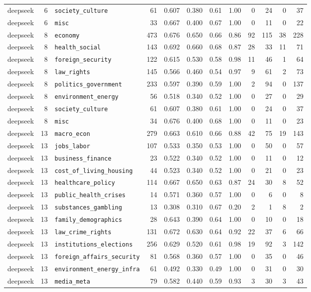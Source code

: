 \begin{landscape}
\begin{longtable}{@{}l r l r r r r r r r r r@{}}
deepseek & 6 & \texttt{society\_culture} & 61 & 0.607 & 0.380 & 0.61 & 1.00 & 0 & 24 & 0 & 37\\
deepseek & 6 & \texttt{misc} & 33 & 0.667 & 0.400 & 0.67 & 1.00 & 0 & 11 & 0 & 22\\
\midrule
deepseek & 8 & \texttt{economy} & 473 & 0.676 & 0.650 & 0.66 & 0.86 & 92 & 115 & 38 & 228\\
deepseek & 8 & \texttt{health\_social} & 143 & 0.692 & 0.660 & 0.68 & 0.87 & 28 & 33 & 11 & 71\\
deepseek & 8 & \texttt{foreign\_security} & 122 & 0.615 & 0.530 & 0.58 & 0.98 & 11 & 46 & 1 & 64\\
deepseek & 8 & \texttt{law\_rights} & 145 & 0.566 & 0.460 & 0.54 & 0.97 & 9 & 61 & 2 & 73\\
deepseek & 8 & \texttt{politics\_government} & 233 & 0.597 & 0.390 & 0.59 & 1.00 & 2 & 94 & 0 & 137\\
deepseek & 8 & \texttt{environment\_energy} & 56 & 0.518 & 0.340 & 0.52 & 1.00 & 0 & 27 & 0 & 29\\
deepseek & 8 & \texttt{society\_culture} & 61 & 0.607 & 0.380 & 0.61 & 1.00 & 0 & 24 & 0 & 37\\
deepseek & 8 & \texttt{misc} & 34 & 0.676 & 0.400 & 0.68 & 1.00 & 0 & 11 & 0 & 23\\
\midrule
deepseek & 13 & \texttt{macro\_econ} & 279 & 0.663 & 0.610 & 0.66 & 0.88 & 42 & 75 & 19 & 143\\
deepseek & 13 & \texttt{jobs\_labor} & 107 & 0.533 & 0.350 & 0.53 & 1.00 & 0 & 50 & 0 & 57\\
deepseek & 13 & \texttt{business\_finance} & 23 & 0.522 & 0.340 & 0.52 & 1.00 & 0 & 11 & 0 & 12\\
deepseek & 13 & \texttt{cost\_of\_living\_housing} & 44 & 0.523 & 0.340 & 0.52 & 1.00 & 0 & 21 & 0 & 23\\
deepseek & 13 & \texttt{healthcare\_policy} & 114 & 0.667 & 0.650 & 0.63 & 0.87 & 24 & 30 & 8 & 52\\
deepseek & 13 & \texttt{public\_health\_crises} & 14 & 0.571 & 0.360 & 0.57 & 1.00 & 0 & 6 & 0 & 8\\
deepseek & 13 & \texttt{substances\_gambling} & 13 & 0.308 & 0.310 & 0.67 & 0.20 & 2 & 1 & 8 & 2\\
deepseek & 13 & \texttt{family\_demographics} & 28 & 0.643 & 0.390 & 0.64 & 1.00 & 0 & 10 & 0 & 18\\
deepseek & 13 & \texttt{law\_crime\_rights} & 131 & 0.672 & 0.630 & 0.64 & 0.92 & 22 & 37 & 6 & 66\\
deepseek & 13 & \texttt{institutions\_elections} & 256 & 0.629 & 0.520 & 0.61 & 0.98 & 19 & 92 & 3 & 142\\
deepseek & 13 & \texttt{foreign\_affairs\_security} & 81 & 0.568 & 0.360 & 0.57 & 1.00 & 0 & 35 & 0 & 46\\
deepseek & 13 & \texttt{environment\_energy\_infra} & 61 & 0.492 & 0.330 & 0.49 & 1.00 & 0 & 31 & 0 & 30\\
deepseek & 13 & \texttt{media\_meta} & 79 & 0.582 & 0.440 & 0.59 & 0.93 & 3 & 30 & 3 & 43\\


\end{longtable}
\end{landscape}
